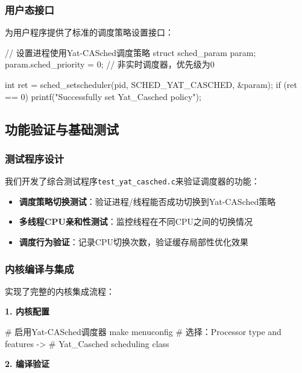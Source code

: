 \subsubsection{用户态接口}

为用户程序提供了标准的调度策略设置接口：

\begin{code}
// 设置进程使用Yat-CASched调度策略
struct sched_param param;
param.sched_priority = 0;  // 非实时调度器，优先级为0

int ret = sched_setscheduler(pid, SCHED_YAT_CASCHED, &param);
if (ret == 0) {
    printf("Successfully set Yat_Casched policy\n");
}
\end{code}

\subsection{功能验证与基础测试}

\subsubsection{测试程序设计}

我们开发了综合测试程序\texttt{test\_yat\_casched.c}来验证调度器的功能：

\begin{itemize}
    \item \textbf{调度策略切换测试}：验证进程/线程能否成功切换到Yat-CASched策略
    \item \textbf{多线程CPU亲和性测试}：监控线程在不同CPU之间的切换情况
    \item \textbf{调度行为验证}：记录CPU切换次数，验证缓存局部性优化效果
\end{itemize}

\subsubsection{内核编译与集成}

实现了完整的内核集成流程：

\textbf{1. 内核配置}
\begin{code}
# 启用Yat-CASched调度器
make menuconfig
# 选择：Processor type and features -> 
#       Yat_Casched scheduling class
\end{code}

\textbf{2. 编译验证}

